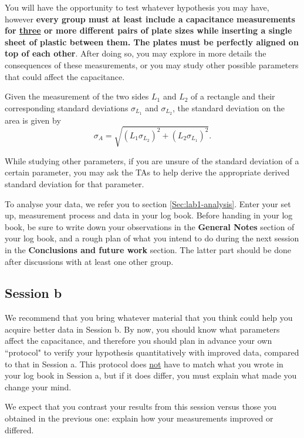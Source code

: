 \documentclass[12pt]{report}
\begin{document}
You will have the opportunity to test whatever hypothesis you may have, however \textbf{every group must at least include a capacitance measurements for \underline{three} or more different pairs of plate sizes while inserting a single sheet of plastic between them. 
The plates must be perfectly aligned on top of each other}. After doing so, you may explore in more details the consequences of these measurements, or you may study other possible parameters that could affect the capacitance.

Given the measurement of the two sides $L_1$ and $L_2$ of a rectangle and their corresponding standard deviations $\sigma_{L_1}$ and $\sigma_{L_2}$, the standard deviation on the area is given by
\begin{equation}
\sigma_A = \sqrt{ \left( L_1 \sigma_{L_2} \right)^2 + \left( L_2 \sigma_{L_1} \right)^2 }.
\end{equation}

While studying other parameters, if you are unsure of the standard deviation of a certain parameter, you may ask the TAs to help derive the appropriate derived standard deviation for that parameter.

To analyse your data, we refer you to section \ref{Sec:lab1-analysis}.
{\color{blue}Enter your set up, measurement process and data in your log book.} Before handing in your log book, be sure to write down your {\color{blue}observations in the \textbf{General Notes} section of your log book, and a rough plan of what you intend to do during the next session in the \textbf{Conclusions and future work} section}. The latter part should be done after discussions with at least one other group.

\subsection{Session b}

We recommend that you bring whatever material that you think could help you acquire better data in Session b. 
By now, you should know what parameters affect the capacitance, and therefore you should plan in advance your own ``protocol" to verify your hypothesis quantitatively with improved data, compared to that in Session a. 
This protocol does \underline{not} have to match what you wrote in your log book in Session a, but if it does differ, you must explain what made you change your mind.

{\color{blue} We expect that you contrast your results from this session versus those you obtained in the previous one: explain how your measurements improved or differed.}
\end{document}
